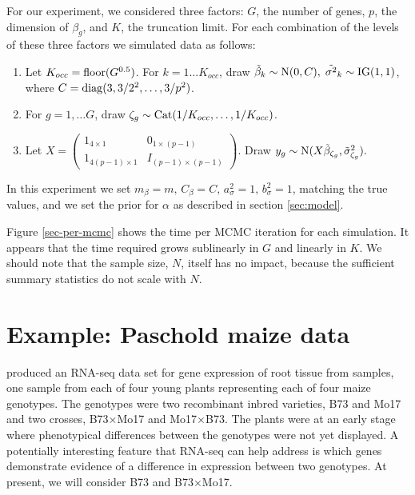 For our experiment, we considered three factors: $G$, the number of genes, $p$, the dimension of $\beta_g$, and $K$, the truncation limit. For each combination of the levels of these three factors we simulated data as follows:

\begin{enumerate}
  \item Let $K_{occ} = \operatorname{floor}(G^{0.5})$. For $k=1 \ldots K_{occ}$, draw $\tilde{\beta}_k \sim \operatorname{N}(0, C),\; \tilde{\sigma^2}_k \sim \operatorname{IG}(1, 1)$, where $C=\operatorname{diag}(3, 3/2^2, \ldots, 3/p^2)$.
  
  \item For $g=1,\ldots G$, draw $\zeta_g \sim \operatorname{Cat}(1/K_{occ},\ldots,1/K_{occ})$. 
  
  \item Let $X = \begin{pmatrix} 1_{4 \times 1} & 0_{1\times(p-1)}\\
                                 1_{4(p-1) \times 1} & I_{(p-1)\times(p-1)} \end{pmatrix}$. Draw $y_{g} \sim \operatorname{N}(X\tilde{\beta}_{\zeta_g}, \tilde{\sigma}^2_{\zeta_g}).$
\end{enumerate}


In this experiment we set $m_\beta = m,\, C_\beta = C,\, a_\sigma^2=1,\, b_\sigma^2=1$, matching the true values, and we set the prior for $\alpha$ as described in section \ref{sec:model}.

Figure \ref{sec-per-mcmc} shows the time per MCMC iteration for each simulation. It appears that the time required grows sublinearly in $G$ and linearly in $K$. We should note that the sample size, $N$, itself has no impact, because the sufficient summary statistics do not scale with $N$.

\section{Example: Paschold maize data}
\citet{paschold} produced an RNA-seq data set for gene expression of root tissue from samples, one sample from each of four young plants representing each of four maize genotypes. The genotypes were two recombinant inbred varieties, B73 and Mo17 and two crosses, B73$\times$Mo17 and Mo17$\times$B73. The plants were at an early stage where phenotypical differences between the genotypes were not yet displayed. A potentially interesting feature that RNA-seq can help address is which genes demonstrate evidence of a difference in expression between two genotypes. At present, we will consider B73 and B73$\times$Mo17.

